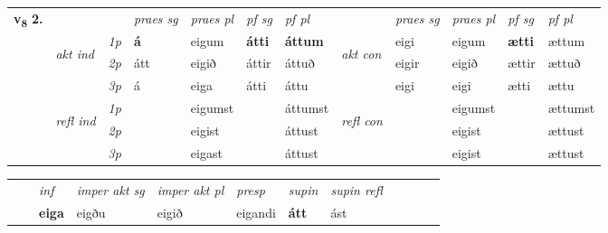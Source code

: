 \begin{tabular}{llllllllllll} \toprule
\multirow{4}{*}{{{\textbf{v{\textsubscript{8}}} \Large{\textbf{2.}}}}}  & &   &  \textit{praes sg}  & \textit{praes pl}  &\textit{ pf sg} & \textit{pf pl} &  &  \textit{praes sg}  & \textit{praes pl}  & \textit{pf sg} & \textit{pf pl } \\*
	\cmidrule{4-7} \cmidrule{9-12}
 & \multirow{3}{*}{\begin{turn}{90}\textit{akt ind}\end{turn}} & {\textit{1p}} & \textbf{á} & eigum    & \textbf{átti} & \textbf{áttum} & \multirow{3}{*}{\begin{turn}{90}\textit{akt con}\end{turn}} &eigi & eigum & \textbf{ætti} & ættum\\*
& &  {\textit{2p}} &  átt  & eigið   & áttir & áttuð & & eigir & eigið & ættir & ættuð \\*
& &  {\textit{3p}} & á & eiga   & átti & áttu & & eigi & eigi& ætti & ættu  \\*
\cmidrule{4-7} \cmidrule{9-12}
 &\multirow{3}{*}{\begin{turn}{90}\textit{refl ind}\end{turn}} & {\textit{1p}} &  & eigumst    &  & áttumst & \multirow{3}{*}{\begin{turn}{90}\textit{refl con}\end{turn}}  & & eigumst &  & ættumst\\*
 &&  {\textit{2p}} &    & eigist   &  & áttust & & & eigist &  & ættust \\*
& &  {\textit{3p}} &  & eigast   &  & áttust & &  & eigist&  & ættust  \\*
\cmidrule{4-7} \cmidrule{9-12}
\end{tabular}


\begin{tabular}{llllllllllll}
 & & \textit{inf} & \textit{imper akt sg} & \textit{imper akt pl}   & \textit{presp} & \textit{supin} & \textit{supin refl}      \\*
  & & \textbf{eiga} & eigðu  & eigið   & eigandi &  \textbf{átt} & ást  \\*
\cmidrule{1-12}
\end{tabular}



